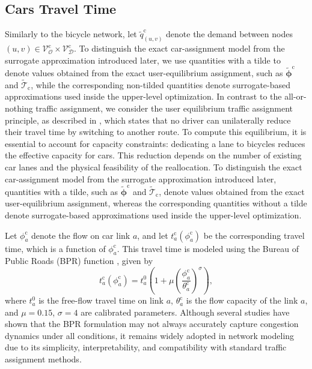 \documentclass[lettersize,journal]{IEEEtran}
\begin{document}
\subsection{Cars Travel Time}
Similarly to the bicycle network, let $\tilde{q}_{(u,v)}^\mathrm{c}$ denote the demand between nodes $(u, v) \in \mathcal{V}_{\mathcal{O}}^\mathrm{c}\times \mathcal{V}_{\mathcal{D}}^\mathrm{c}$. To distinguish the exact car-assignment model from the surrogate approximation introduced later, we use quantities with a tilde to denote values obtained from the exact user-equilibrium assignment, such as $\tilde{\boldsymbol{\phi}}^\mathrm{c}$ and $\tilde{\mathcal{T}}_\mathrm{c}$, while the corresponding non-tilded quantities denote surrogate-based approximations used inside the upper-level optimization. In contrast to the all-or-nothing traffic assignment, we consider the user equilibrium traffic assignment principle, as described in \cite{maerivoet2005transportation}, which states that no driver can unilaterally reduce their travel time by switching to another route. To compute this equilibrium, it is essential to account for capacity constraints: dedicating a lane to bicycles reduces the effective capacity for cars. This reduction depends on the number of existing car lanes and the physical feasibility of the reallocation. To distinguish the exact car-assignment model from the surrogate approximation introduced later, quantities with a tilde, such as 
$\tilde{\boldsymbol{\phi}}^\mathrm{c}$ and $\tilde{\mathcal{T}}_\mathrm{c}$, 
denote values obtained from the exact user-equilibrium assignment, whereas the corresponding quantities without a tilde denote surrogate-based approximations used inside the upper-level optimization.

Let $\phi_a^\mathrm{c}$ denote the flow on car link $a$, and let $t_a^\mathrm{c}(\phi_a^\mathrm{c})$ be the corresponding travel time, which is a function of $\phi_a^\mathrm{c}$. This travel time is modeled using the Bureau of Public Roads (BPR) function \cite{united1964traffic}, given by
\begin{equation}
    t_a^\mathrm{c}(\phi_a^\mathrm{c}) = t_a^0 \left( 1 + \mu \left( \frac{\phi_a^\mathrm{c}}{\theta_a^\mathrm{c}} \right)^\sigma \right),
\end{equation}
where $t_a^0$ is the free-flow travel time on link $a$, $\theta_a^\mathrm{c}$ is the flow capacity of the link $a$, and $\mu = 0.15$, $\sigma = 4$ are calibrated parameters. 
Although several studies have shown that the BPR formulation may not always accurately capture congestion dynamics under all conditions, it remains widely adopted in network modeling due to its simplicity, interpretability, and compatibility with standard traffic assignment methods.
\end{document}
